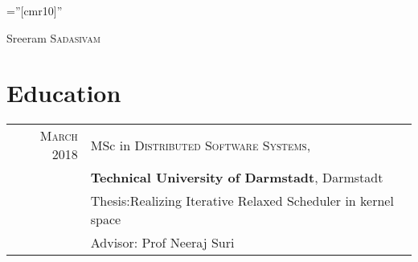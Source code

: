 

\pagestyle{empty}
\font \fb=''[cmr10]''
\par{	\centering
	{
		 \Huge Sreeram \textsc{Sadasivam}
	}\bigskip
\par}
\section{Education}
\begin{tabular}{rl}
\textsc{March} 2018 & MSc in \textsc{Distributed Software Systems},\\& \textbf{Technical University of Darmstadt}, Darmstadt\\ & Thesis:Realizing Iterative Relaxed Scheduler in kernel space\\& Advisor: Prof Neeraj Suri
\end{tabular}

